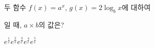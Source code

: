 두 함수 $f(x)=a^x$, $g(x)=2\log_b x$에 대하여 \par\smallskip{}\par\smallskip\noindent 일 때, $a\times b$의 값은? 
\begin{choices32}{$e^{\frac{1}{e}}$}{$e^{\frac{2}{e}}$}{$e^{\frac{3}{e}}$}{$e^{\frac{4}{e}}$}{$e^{\frac{5}{e}}$}\end{choices32}
